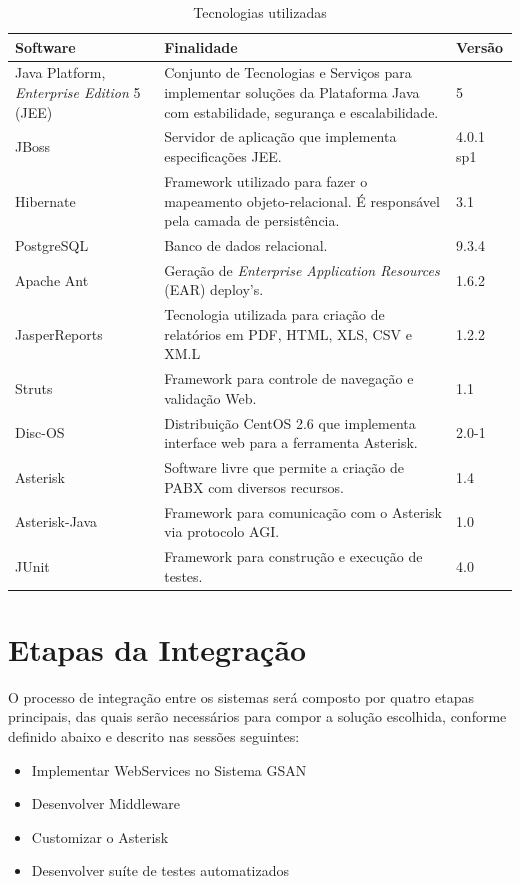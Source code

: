 \begin{table}[H]
	\center
	\footnotesize
	\caption{Tecnologias utilizadas}
	\label{tabela:tecnologiasUtilizadas}
	\begin{tabular}{|p{4cm}|p{7cm}|p{2cm}|}
		\hline
		\textbf{Software} & \textbf{Finalidade} & \textbf{Versão} \\
		\hline
		Java Platform, \textit{Enterprise Edition} 5 (JEE) & Conjunto de Tecnologias e Serviços para implementar soluções da Plataforma Java com estabilidade, segurança e escalabilidade. & 5 \\
		\hline
		JBoss 				& Servidor de aplicação que implementa especificações JEE. 								& 4.0.1 sp1 \\
		\hline
		Hibernate 			& Framework utilizado para fazer o mapeamento objeto-relacional. É responsável pela camada de persistência. & 3.1 \\
		\hline
		PostgreSQL 			& Banco de dados relacional. 															& 9.3.4 \\
		\hline
		Apache Ant 			& Geração de \textit{Enterprise Application Resources} (EAR) deploy’s. 					& 1.6.2 \\
		\hline
		JasperReports 		& Tecnologia utilizada para criação de relatórios em PDF, HTML, XLS, CSV e XM.L 		& 1.2.2 \\
		\hline
		Struts 				& Framework para controle de navegação e validação Web. 								& 1.1	 \\
		\hline
		Disc-OS 			& Distribuição CentOS 2.6 que implementa interface web para a ferramenta Asterisk. 		& 2.0-1 \\
		\hline
		Asterisk 			& Software livre que permite a criação de PABX com diversos recursos. 					& 1.4 \\		
		\hline
		Asterisk-Java 		& Framework para comunicação com o Asterisk via protocolo AGI. 							& 1.0 \\
		\hline
		JUnit		 		& Framework para construção e execução de testes. 										& 4.0 \\		
		\hline			
	\end{tabular}
\end{table}



\section{Etapas da Integração}
O processo de integração entre os sistemas será composto por quatro etapas principais, das quais serão necessários para compor a solução escolhida, conforme definido abaixo e descrito nas sessões seguintes:

\begin{itemize}
	\item Implementar WebServices no Sistema GSAN 
	\item Desenvolver Middleware
	\item Customizar o Asterisk	
	\item Desenvolver suíte de testes automatizados
\end{itemize}
